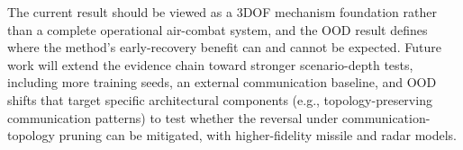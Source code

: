 The current result should be viewed as a 3DOF mechanism foundation rather than a complete operational air-combat system, and the OOD result defines where the method's early-recovery benefit can and cannot be expected. Future work will extend the evidence chain toward stronger scenario-depth tests, including more training seeds, an external communication baseline, and OOD shifts that target specific architectural components (e.g., topology-preserving communication patterns) to test whether the reversal under communication-topology pruning can be mitigated, with higher-fidelity missile and radar models.
